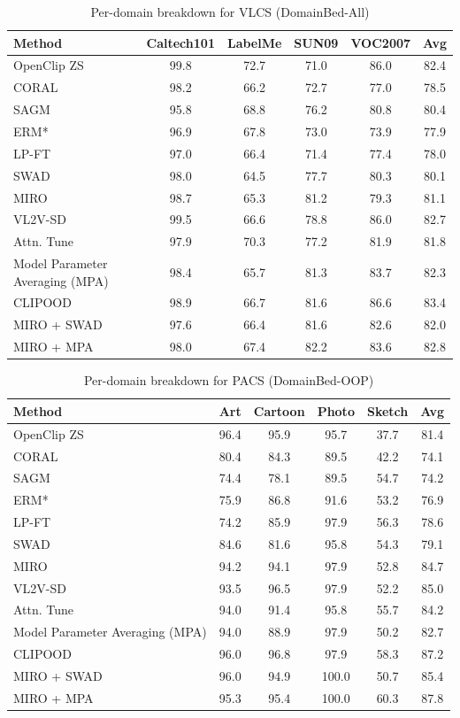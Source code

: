 \documentclass{article} %
\begin{document}
\begin{table}[t]
\small
\centering
\caption{Per-domain breakdown for VLCS (DomainBed-All)}
\begin{tabular}{lccccc}
\toprule
\textbf{Method} & Caltech101 & LabelMe & SUN09 & VOC2007 & Avg \\ \midrule
OpenClip ZS & 99.8 & 72.7 & 71.0 & 86.0 & 82.4 \\
\midrule
CORAL & 98.2 & 66.2 & 72.7 & 77.0 & 78.5 \\ 
SAGM & 95.8 & 68.8 & 76.2 & 80.8 & 80.4 \\ 
ERM* & 96.9 & 67.8 & 73.0 & 73.9 & 77.9 \\ 
LP-FT & 97.0 & 66.4 & 71.4 & 77.4 & 78.0 \\ 
SWAD & 98.0 & 64.5 & 77.7 & 80.3 & 80.1 \\ 
MIRO & 98.7 & 65.3 & 81.2 & 79.3 & 81.1 \\ 
VL2V-SD & 99.5 & 66.6 & 78.8 & 86.0 & 82.7 \\ 
Attn. Tune & 97.9 & 70.3 & 77.2 & 81.9 & 81.8 \\ 
Model Parameter Averaging (MPA) & 98.4 & 65.7 & 81.3 & 83.7 & 82.3 \\ 
CLIPOOD &  98.9  & 66.7 & 81.6   & 86.6  & 83.4\\\hline
MIRO + SWAD & 97.6 & 66.4 & 81.6 & 82.6 & 82.0 \\ 
MIRO +  MPA & 98.0 & 67.4 & 82.2 & 83.6 & 82.8 \\ 
\bottomrule
\end{tabular}
\label{table:VLCS overall}
\end{table}


\begin{table}[t]
\small
\centering
\caption{Per-domain breakdown for PACS (DomainBed-OOP)}
\begin{tabular}{lccccc}
\toprule
\textbf{Method} & Art & Cartoon & Photo & Sketch & Avg \\ \midrule
OpenClip ZS & 96.4 & 95.9 & 95.7& 37.7 & 81.4 \\
\midrule
CORAL & 80.4 & 84.3 & 89.5 & 42.2 & 74.1 \\ 
SAGM & 74.4 & 78.1 & 89.5 & 54.7 & 74.2 \\ 
ERM* & 75.9 & 86.8 & 91.6 & 53.2 & 76.9 \\ 
LP-FT & 74.2 & 85.9 & 97.9 & 56.3 & 78.6 \\ 
SWAD & 84.6 & 81.6 & 95.8 & 54.3 & 79.1 \\ 
MIRO & 94.2 & 94.1 & 97.9 & 52.8 & 84.7 \\ 
VL2V-SD & 93.5 & 96.5 & 97.9 & 52.2 & 85.0 \\ 
Attn. Tune & 94.0 & 91.4 & 95.8 & 55.7 & 84.2 \\ 
Model Parameter Averaging (MPA) & 94.0 & 88.9 & 97.9 & 50.2 & 82.7 \\
CLIPOOD & 96.0  & 96.8 & 97.9   &  58.3   & 87.2 \\\hline
MIRO + SWAD & 96.0 & 94.9 & 100.0 & 50.7 & 85.4 \\ 
MIRO + MPA  & 95.3 & 95.4 & 100.0 & 60.3 & 87.8 \\ 
\bottomrule
\end{tabular}
\label{table:PACS OOP}
\end{table}
\end{document}
